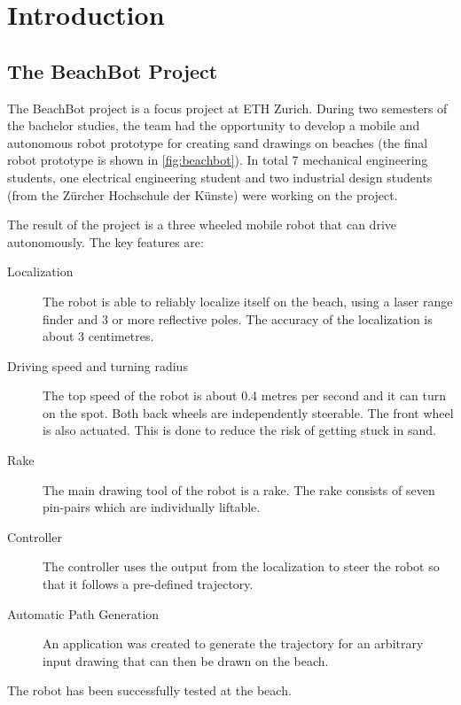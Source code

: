\chapter{Introduction}
\section{The BeachBot Project}
The BeachBot project is a focus project at ETH Zurich. During two semesters of the bachelor studies, the team had the opportunity to develop a mobile and autonomous robot prototype for creating sand drawings on beaches (the final robot prototype is shown in \autoref{fig:beachbot}). In total 7 mechanical engineering students, one electrical engineering student and two industrial design students (from the Zürcher Hochschule der Künste) were working on the project. 

The result of the project is a three wheeled mobile robot that can drive autonomously. The key features are:
\begin{description}
\item[Localization] The robot is able to reliably localize itself on the beach, using a laser range finder and 3 or more reflective poles. The accuracy of the localization is about 3 centimetres.
\item[Driving speed and turning radius] The top speed of the robot is about 0.4 metres per second and it can turn on the spot. Both back wheels are independently steerable. The front wheel is also actuated. This is done to reduce the risk of getting stuck in sand.
\item[Rake] The main drawing tool of the robot is a rake. The rake consists of seven pin-pairs which are individually liftable.
\item[Controller] The controller uses the output from the localization to steer the robot so that it follows a pre-defined trajectory.
\item[Automatic Path Generation] An application was created to generate the trajectory for an arbitrary input drawing  that can then be drawn on the beach.
\end{description}

The robot has been successfully tested at the beach.

